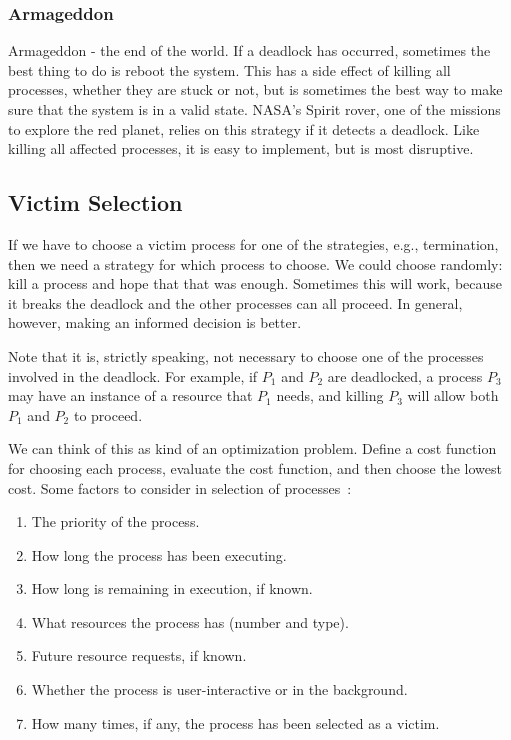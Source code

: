 \subsubsection*{Armageddon}
Armageddon - the end of the world. If a deadlock has occurred, sometimes the best thing to do is reboot the system. This has a side effect of killing all processes, whether they are stuck or not, but is sometimes the best way to make sure that the system is in a valid state. NASA's Spirit rover, one of the missions to explore the red planet, relies on this strategy if it detects a deadlock. Like killing all affected processes, it is easy to implement, but is most disruptive.


\subsection*{Victim Selection}
If we have to choose a victim process for one of the strategies, e.g., termination, then we need a strategy for which process to choose. We could choose randomly: kill a process and hope that that was enough. Sometimes this will work, because it breaks the deadlock and the other processes can all proceed. In general, however, making an informed decision is better.

Note that it is, strictly speaking, not necessary to choose one of the processes involved in the deadlock. For example, if $P_{1}$ and $P_{2}$ are deadlocked, a process $P_{3}$  may have an instance of a resource that $P_{1}$ needs, and killing $P_{3}$ will allow both $P_{1}$ and $P_{2}$ to proceed.

We can think of this as kind of an optimization problem. Define a cost function for choosing each process, evaluate the cost function, and then choose the lowest cost. Some factors to consider in selection of processes~\cite{osc}:

\begin{enumerate}
	\item The priority of the process.
	\item How long the process has been executing.
	\item How long is remaining in execution, if known.
	\item What resources the process has (number and type).
	\item Future resource requests, if known.
	\item Whether the process is user-interactive or in the background.
	\item How many times, if any, the process has been selected as a victim.
\end{enumerate}

